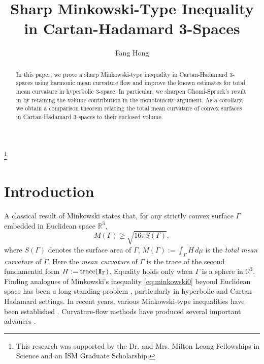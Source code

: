 \documentclass[11pt]{amsart}
\theoremstyle{definition}
\newcommand{\RR}{\mathbb{R}}
\theoremstyle{remark}
\numberwithin{equation}{section}
\begin{document}
	\setlength{\baselineskip}{1.2\baselineskip}
	
	\title[Sharp Minkowski-Type Inequality in Cartan-Hadamard 3-Spaces]{Sharp Minkowski-Type Inequality in Cartan-Hadamard 3-Spaces}
	
	\author[F. Hong]{Fang Hong}
	\address{Department of Mathematics and Statistics, McGill University, Montreal, Quebec, H3A 2K6, Canada.}

	\begin{abstract}
		In this paper, we prove a sharp Minkowski-type inequality in Cartan-Hadamard 3-spaces using harmonic mean curvature flow and improve the known estimates for total mean curvature in hyperbolic 3-space. In particular, we sharpen Ghomi-Spruck's result in \cite{ghomi-spruck2023} by retaining the volume contribution in the monotonicity argument. As a corollary, we obtain a comparison theorem relating the total mean curvature of convex surfaces in Cartan-Hadamard 3-spaces to their enclosed volume.
	\end{abstract}
	
	\thanks{This research was supported by the Dr. and Mrs. Milton Leong Fellowships in Science and an ISM Graduate Scholarship.}
	
	\maketitle
	
	
	
	\section{Introduction}
	
	A classical result of Minkowski \cite{minkowski1903} states that,
		for any strictly convex surface $\Gamma$ embedded in Euclidean space $\RR^3$,
		\begin{equation}
			\label{eq:minkowski0}
			M(\Gamma)\geq \sqrt{16\pi S(\Gamma)},
		\end{equation}
		where $S(\Gamma)$ denotes the surface area of $\Gamma$, $M(\Gamma) := \int_\Gamma H\,d\mu$ is the \emph{total mean curvature} of $\Gamma$. Here the \emph{mean curvature} of $\Gamma$ is the trace of the second fundamental form $H:=\textup{trace}(\mathrm{I\!I}_\Gamma)$. Equality holds only when $\Gamma$ is a sphere in $\RR^3$.
	Finding analogues of Minkowski’s inequality \eqref{eq:minkowski0} beyond Euclidean space has been a long-standing problem \cite{santalo1963}, particularly in hyperbolic and Cartan--Hadamard settings.
	In recent years, various Minkowski-type inequalities have been established \cites{gallego-solanes,natario2015,brendle-wang}. Curvature-flow methods have produced several important advances \cites{wang-xia2014,ge-wang-wu2014,andrews-hu-li-2020,scheuer2020,Brendle-Guan-Li}.
	
\end{document}
